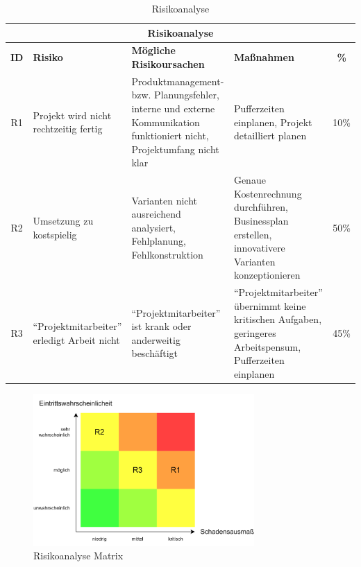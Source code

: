 \begin{table}[H]
  \centering
  \small
  \begin{tabular}{c|p{}|p{}|p{}|c}
    \multicolumn{5}{c}{\textbf{Risikoanalyse}}                                                                                                                                                                                                                                                                                   \\
    \toprule
    \textbf{ID} & \textbf{Risiko}                                    & \textbf{Mögliche Risikoursachen}                                                                                       & \textbf{Maßnahmen}                                                                                                 & \textbf{\%} \\
    \midrule
    R1          & Projekt wird nicht rechtzeitig fertig              & Produktmanagement- bzw. Planungsfehler, interne und externe Kommunikation funktioniert nicht, Projektumfang nicht klar & Pufferzeiten einplanen, Projekt detailliert planen                                                                 & 10\%        \\ \ghline
    R2          & Umsetzung zu kostspielig                           & Varianten nicht ausreichend analysiert, Fehlplanung, Fehlkonstruktion                                                  & Genaue Kostenrechnung durchführen, Businessplan erstellen, innovativere Varianten konzeptionieren                  & 50\%        \\ \ghline
    R3          & \enquote{Projektmitarbeiter} erledigt Arbeit nicht & \enquote{Projektmitarbeiter} ist krank oder anderweitig beschäftigt                                                    & \enquote{Projektmitarbeiter} übernimmt keine kritischen Aufgaben, geringeres Arbeitspensum, Pufferzeiten einplanen & 45\%        \\
    \bottomrule
  \end{tabular}
  \caption{Risikoanalyse}
  \label{tab:risikoanalyse}
\end{table}

\begin{figure}[H]
  \centering
  \includegraphics[width=0.75\textwidth]{images/risikoanalyse.png}
  \caption{Risikoanalyse Matrix}
  \label{fig:risikoanalyse_matrix}
\end{figure}